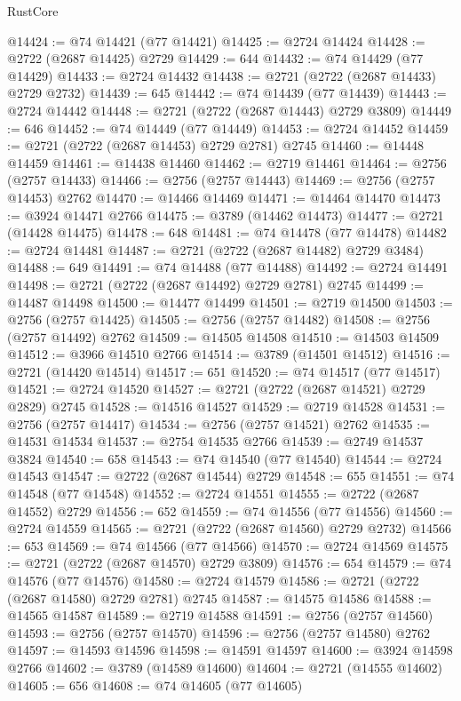 \begin{lexlean}{RustCore}
\begin{coremodule}
@14424 := @74 @14421 (@77 @14421)
@14425 := @2724 @14424
@14428 := @2722 (@2687 @14425) @2729
@14429 := 644
@14432 := @74 @14429 (@77 @14429)
@14433 := @2724 @14432
@14438 := @2721 (@2722 (@2687 @14433) @2729 @2732)
@14439 := 645
@14442 := @74 @14439 (@77 @14439)
@14443 := @2724 @14442
@14448 := @2721 (@2722 (@2687 @14443) @2729 @3809)
@14449 := 646
@14452 := @74 @14449 (@77 @14449)
@14453 := @2724 @14452
@14459 := @2721 (@2722 (@2687 @14453) @2729 @2781) @2745
@14460 := @14448 @14459
@14461 := @14438 @14460
@14462 := @2719 @14461
@14464 := @2756 (@2757 @14433)
@14466 := @2756 (@2757 @14443)
@14469 := @2756 (@2757 @14453) @2762
@14470 := @14466 @14469
@14471 := @14464 @14470
@14473 := @3924 @14471 @2766
@14475 := @3789 (@14462 @14473)
@14477 := @2721 (@14428 @14475)
@14478 := 648
@14481 := @74 @14478 (@77 @14478)
@14482 := @2724 @14481
@14487 := @2721 (@2722 (@2687 @14482) @2729 @3484)
@14488 := 649
@14491 := @74 @14488 (@77 @14488)
@14492 := @2724 @14491
@14498 := @2721 (@2722 (@2687 @14492) @2729 @2781) @2745
@14499 := @14487 @14498
@14500 := @14477 @14499
@14501 := @2719 @14500
@14503 := @2756 (@2757 @14425)
@14505 := @2756 (@2757 @14482)
@14508 := @2756 (@2757 @14492) @2762
@14509 := @14505 @14508
@14510 := @14503 @14509
@14512 := @3966 @14510 @2766
@14514 := @3789 (@14501 @14512)
@14516 := @2721 (@14420 @14514)
@14517 := 651
@14520 := @74 @14517 (@77 @14517)
@14521 := @2724 @14520
@14527 := @2721 (@2722 (@2687 @14521) @2729 @2829) @2745
@14528 := @14516 @14527
@14529 := @2719 @14528
@14531 := @2756 (@2757 @14417)
@14534 := @2756 (@2757 @14521) @2762
@14535 := @14531 @14534
@14537 := @2754 @14535 @2766
@14539 := @2749 @14537 @3824
@14540 := 658
@14543 := @74 @14540 (@77 @14540)
@14544 := @2724 @14543
@14547 := @2722 (@2687 @14544) @2729
@14548 := 655
@14551 := @74 @14548 (@77 @14548)
@14552 := @2724 @14551
@14555 := @2722 (@2687 @14552) @2729
@14556 := 652
@14559 := @74 @14556 (@77 @14556)
@14560 := @2724 @14559
@14565 := @2721 (@2722 (@2687 @14560) @2729 @2732)
@14566 := 653
@14569 := @74 @14566 (@77 @14566)
@14570 := @2724 @14569
@14575 := @2721 (@2722 (@2687 @14570) @2729 @3809)
@14576 := 654
@14579 := @74 @14576 (@77 @14576)
@14580 := @2724 @14579
@14586 := @2721 (@2722 (@2687 @14580) @2729 @2781) @2745
@14587 := @14575 @14586
@14588 := @14565 @14587
@14589 := @2719 @14588
@14591 := @2756 (@2757 @14560)
@14593 := @2756 (@2757 @14570)
@14596 := @2756 (@2757 @14580) @2762
@14597 := @14593 @14596
@14598 := @14591 @14597
@14600 := @3924 @14598 @2766
@14602 := @3789 (@14589 @14600)
@14604 := @2721 (@14555 @14602)
@14605 := 656
@14608 := @74 @14605 (@77 @14605)

\end{coremodule}
\end{lexlean}
